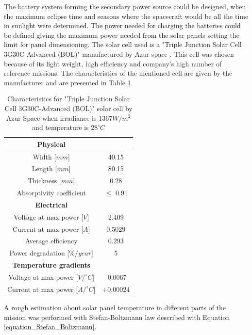 \documentclass[a4paper, oneside, 11pt]{article}
\begin{document}
\noindent The battery system forming the secondary power source could be designed, when the maximum eclipse time and seasons where the spacecraft would be all the time in sunlight were determined. The power needed for charging the batteries could be defined giving the maximum power needed from the solar panels setting the limit for panel dimensioning. The solar cell used is a "Triple Junction Solar Cell 3G30C-Advanced (BOL)" manufactured by Azur space \cite{Solar_cell}. This cell was chosen because of its light weight, high efficiency and company's high number of reference missions. The characteristics of the mentioned cell are given by the manufacturer and are presented in Table \ref{table_solar_cell}.\\

\begin{table}[h]
 \caption{Characteristics for "Triple Junction Solar Cell 3G30C-Advanced (BOL)" solar cell by Azur Space when irradiance is $1367W/m^2$ and temperature is $28^{\circ}C$ \cite{Solar_cell}}
 \label{table_solar_cell}
\centering
 \begin{tabular}{| c | c |}
  \hline
	\textbf{Physical}	& \\
  \hline
  	Width [$mm$]		& 40.15 \\
    Length [$mm$]		& 80.15 \\
    Thickness [$mm$]	& 0.28 \\
    Absorptivity coefficient & $\leq$ 0.91\\
  \hline
  	\textbf{Electrical} & \\
  \hline
  	Voltage at max power [$V$] & 2.409\\
    Current at max power [$A$] & 0.5029\\
    Average efficiency & 0.293\\
    Power degradation [$\%/year$] & 5\\
  \hline
  	\textbf{Temperature gradients} & \\
  \hline
  	Voltage at max power [$V/^{\circ}C$] & -0.0067\\
    Current at max power [$A/^{\circ}C$] & +0.00024\\
  \hline
\end{tabular}
\end{table}

A rough estimation about solar panel temperature in different parts of the mission was performed with Stefan-Boltzmann law described with Equation \ref{equation_Stefan_Boltzmann}. 
\end{document}
